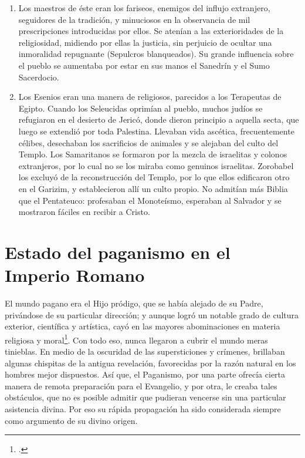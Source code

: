 \raggedbottom{} \documentclass[12pt, a4paper, openany]{book} %
\begin{document}
\begin{enumerate}
\begin{enumerate}
          \item Los maestros de éste eran los fariseos, enemigos del influjo extranjero, seguidores de la tradición, y minuciosos en la observancia de mil prescripciones introducidas por ellos. Se atenían a las exterioridades de la religiosidad, midiendo por ellas la justicia, sin perjuicio de ocultar una inmoralidad repugnante (Sepulcros blanqueados). Su grande influencia sobre el pueblo se aumentaba por estar en sus manos el Sanedrín y el Sumo Sacerdocio.
          \item Los Esenios eran una manera de religiosos, parecidos a los Terapeutas de Egipto. Cuando los Seleucidas oprimían al pueblo, muchos judíos se refugiaron en el desierto de Jericó, donde dieron principio a aquella secta, que luego se extendió por toda Palestina. Llevaban vida ascética, frecuentemente célibes, desechaban los sacrificios de animales y se alejaban del culto del Templo. Los Samaritanos se formaron por la mezcla de israelitas y colonos extranjeros, por lo cual no se los miraba como genuinos israelitas. Zorobabel los excluyó de la reconstrucción del Templo, por lo que ellos edificaron otro en el Garizim, y establecieron allí un culto propio. No admitían más Biblia que el Pentateuco: profesaban el Monoteísmo, esperaban al Salvador y se mostraron fáciles en recibir a Cristo.
        \end{enumerate}
\end{enumerate}
\section{Estado del paganismo en el Imperio Romano}
El mundo pagano era el Hijo pródigo, que se había alejado de su Padre, privándose de su particular dirección; y aunque logró un notable grado de cultura exterior, científica y artística, cayó en las mayores abominaciones en materia religiosa y moral\footcites{Eusebius313Preparatio}{SanAgustin426DeCivitate}.
Con todo eso, nunca llegaron a cubrir el mundo meras tinieblas. En medio de la oscuridad de las supersticiones y crímenes, brillaban algunas chispitas de la antigua revelación, favorecidas por la razón natural en los hombres mejor dispuestos. Así que, el Paganismo, por una parte ofrecía cierta manera de remota preparación para el Evangelio, y por otra, le creaba tales obstáculos, que no es posible admitir que pudieran vencerse sin una particular asistencia divina. Por eso su rápida propagación ha sido considerada siempre como argumento de su divino origen.
\end{document}
